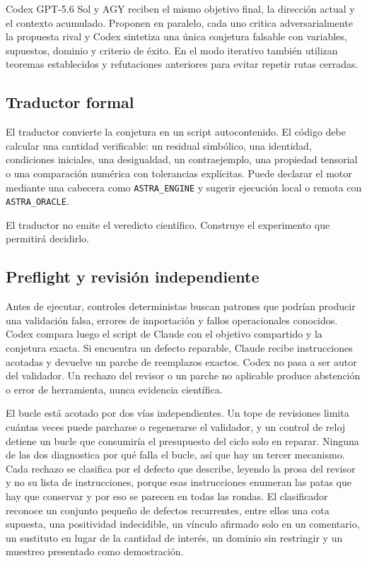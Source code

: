 \documentclass[11pt,a4paper]{article}
\begin{document}
Codex GPT-5.6 Sol y AGY reciben el mismo objetivo final, la dirección actual y el contexto acumulado. Proponen en paralelo, cada uno critica adversarialmente la propuesta rival y Codex sintetiza una única conjetura falsable con variables, supuestos, dominio y criterio de éxito. En el modo iterativo también utilizan teoremas establecidos y refutaciones anteriores para evitar repetir rutas cerradas.

\subsection{Traductor formal}

El traductor convierte la conjetura en un script autocontenido. El código debe calcular una cantidad verificable: un residual simbólico, una identidad, condiciones iniciales, una desigualdad, un contraejemplo, una propiedad tensorial o una comparación numérica con tolerancias explícitas. Puede declarar el motor mediante una cabecera como \texttt{ASTRA\_ENGINE} y sugerir ejecución local o remota con \texttt{ASTRA\_ORACLE}.

El traductor no emite el veredicto científico. Construye el experimento que permitirá decidirlo.

\subsection{Preflight y revisión independiente}

Antes de ejecutar, controles deterministas buscan patrones que podrían producir una validación falsa, errores de importación y fallos operacionales conocidos. Codex compara luego el script de Claude con el objetivo compartido y la conjetura exacta. Si encuentra un defecto reparable, Claude recibe instrucciones acotadas y devuelve un parche de reemplazos exactos. Codex no pasa a ser autor del validador. Un rechazo del revisor o un parche no aplicable produce abstención o error de herramienta, nunca evidencia científica.

El bucle está acotado por dos vías independientes. Un tope de revisiones limita cuántas veces puede parcharse o regenerarse el validador, y un control de reloj detiene un bucle que consumiría el presupuesto del ciclo solo en reparar. Ninguna de las dos diagnostica por qué falla el bucle, así que hay un tercer mecanismo. Cada rechazo se clasifica por el defecto que describe, leyendo la prosa del revisor y no su lista de instrucciones, porque esas instrucciones enumeran las patas que hay que conservar y por eso se parecen en todas las rondas. El clasificador reconoce un conjunto pequeño de defectos recurrentes, entre ellos una cota supuesta, una positividad indecidible, un vínculo afirmado solo en un comentario, un sustituto en lugar de la cantidad de interés, un dominio sin restringir y un muestreo presentado como demostración.
\end{document}
